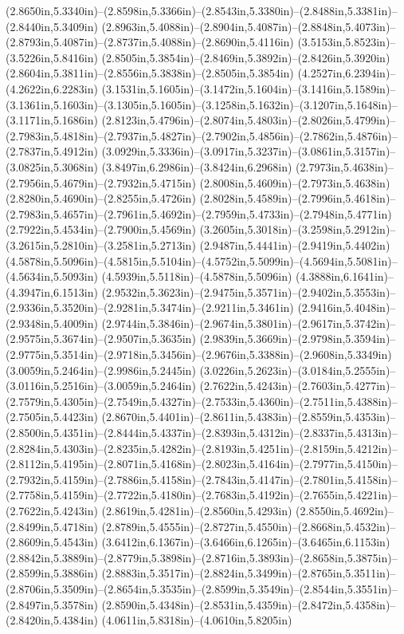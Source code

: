 (2.8650in,5.3340in)--(2.8598in,5.3366in)--(2.8543in,5.3380in)--(2.8488in,5.3381in)--(2.8440in,5.3409in) (2.8963in,5.4088in)--(2.8904in,5.4087in)--(2.8848in,5.4073in)--(2.8793in,5.4087in)--(2.8737in,5.4088in)--(2.8690in,5.4116in) (3.5153in,5.8523in)--(3.5226in,5.8416in) (2.8505in,5.3854in)--(2.8469in,5.3892in)--(2.8426in,5.3920in) (2.8604in,5.3811in)--(2.8556in,5.3838in)--(2.8505in,5.3854in) (4.2527in,6.2394in)--(4.2622in,6.2283in) (3.1531in,5.1605in)--(3.1472in,5.1604in)--(3.1416in,5.1589in)--(3.1361in,5.1603in)--(3.1305in,5.1605in)--(3.1258in,5.1632in)--(3.1207in,5.1648in)--(3.1171in,5.1686in) (2.8123in,5.4796in)--(2.8074in,5.4803in)--(2.8026in,5.4799in)--(2.7983in,5.4818in)--(2.7937in,5.4827in)--(2.7902in,5.4856in)--(2.7862in,5.4876in)--(2.7837in,5.4912in) (3.0929in,5.3336in)--(3.0917in,5.3237in)--(3.0861in,5.3157in)--(3.0825in,5.3068in) (3.8497in,6.2986in)--(3.8424in,6.2968in) (2.7973in,5.4638in)--(2.7956in,5.4679in)--(2.7932in,5.4715in) (2.8008in,5.4609in)--(2.7973in,5.4638in) (2.8280in,5.4690in)--(2.8255in,5.4726in) (2.8028in,5.4589in)--(2.7996in,5.4618in)--(2.7983in,5.4657in)--(2.7961in,5.4692in)--(2.7959in,5.4733in)--(2.7948in,5.4771in) (2.7922in,5.4534in)--(2.7900in,5.4569in) (3.2605in,5.3018in)--(3.2598in,5.2912in)--(3.2615in,5.2810in)--(3.2581in,5.2713in) (2.9487in,5.4441in)--(2.9419in,5.4402in) (4.5878in,5.5096in)--(4.5815in,5.5104in)--(4.5752in,5.5099in)--(4.5694in,5.5081in)--(4.5634in,5.5093in) (4.5939in,5.5118in)--(4.5878in,5.5096in) (4.3888in,6.1641in)--(4.3947in,6.1513in) (2.9532in,5.3623in)--(2.9475in,5.3571in)--(2.9402in,5.3553in)--(2.9336in,5.3520in)--(2.9281in,5.3474in)--(2.9211in,5.3461in) (2.9416in,5.4048in)--(2.9348in,5.4009in) (2.9744in,5.3846in)--(2.9674in,5.3801in)--(2.9617in,5.3742in)--(2.9575in,5.3674in)--(2.9507in,5.3635in) (2.9839in,5.3669in)--(2.9798in,5.3594in)--(2.9775in,5.3514in)--(2.9718in,5.3456in)--(2.9676in,5.3388in)--(2.9608in,5.3349in) (3.0059in,5.2464in)--(2.9986in,5.2445in) (3.0226in,5.2623in)--(3.0184in,5.2555in)--(3.0116in,5.2516in)--(3.0059in,5.2464in) (2.7622in,5.4243in)--(2.7603in,5.4277in)--(2.7579in,5.4305in)--(2.7549in,5.4327in)--(2.7533in,5.4360in)--(2.7511in,5.4388in)--(2.7505in,5.4423in) (2.8670in,5.4401in)--(2.8611in,5.4383in)--(2.8559in,5.4353in)--(2.8500in,5.4351in)--(2.8444in,5.4337in)--(2.8393in,5.4312in)--(2.8337in,5.4313in)--(2.8284in,5.4303in)--(2.8235in,5.4282in)--(2.8193in,5.4251in)--(2.8159in,5.4212in)--(2.8112in,5.4195in)--(2.8071in,5.4168in)--(2.8023in,5.4164in)--(2.7977in,5.4150in)--(2.7932in,5.4159in)--(2.7886in,5.4158in)--(2.7843in,5.4147in)--(2.7801in,5.4158in)--(2.7758in,5.4159in)--(2.7722in,5.4180in)--(2.7683in,5.4192in)--(2.7655in,5.4221in)--(2.7622in,5.4243in) (2.8619in,5.4281in)--(2.8560in,5.4293in) (2.8550in,5.4692in)--(2.8499in,5.4718in) (2.8789in,5.4555in)--(2.8727in,5.4550in)--(2.8668in,5.4532in)--(2.8609in,5.4543in) (3.6412in,6.1367in)--(3.6466in,6.1265in)--(3.6465in,6.1153in) (2.8842in,5.3889in)--(2.8779in,5.3898in)--(2.8716in,5.3893in)--(2.8658in,5.3875in)--(2.8599in,5.3886in) (2.8883in,5.3517in)--(2.8824in,5.3499in)--(2.8765in,5.3511in)--(2.8706in,5.3509in)--(2.8654in,5.3535in)--(2.8599in,5.3549in)--(2.8544in,5.3551in)--(2.8497in,5.3578in) (2.8590in,5.4348in)--(2.8531in,5.4359in)--(2.8472in,5.4358in)--(2.8420in,5.4384in) (4.0611in,5.8318in)--(4.0610in,5.8205in) 